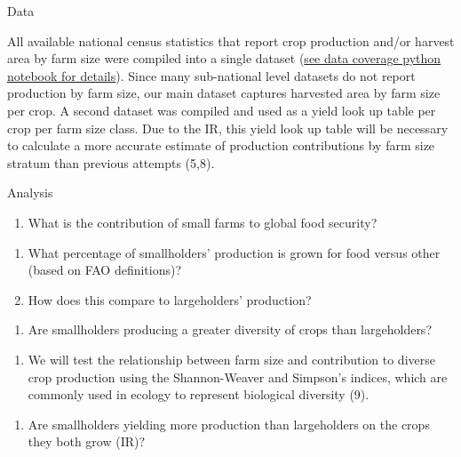 \documentclass[11pt]{article}
\providecommand{\tightlist}{%
      \setlength{\itemsep}{0pt}\setlength{\parskip}{0pt}}
\begin{document}
    Data

All available national census statistics that report crop production
and/or harvest area by farm size were compiled into a single dataset
(\href{https://vinnyricciardi6.wixsite.com/project-portfolio/farm-size-1}{see
data coverage python notebook for details}). Since many sub-national
level datasets do not report production by farm size, our main dataset
captures harvested area by farm size per crop. A second dataset was
compiled and used as a yield look up table per crop per farm size class.
Due to the IR, this yield look up table will be necessary to calculate a
more accurate estimate of production contributions by farm size stratum
than previous attempts (5,8).

    Analysis

\begin{enumerate}
\def\labelenumi{\arabic{enumi}.}
\tightlist
\item
  What is the contribution of small farms to global food security?
\end{enumerate}

\begin{enumerate}
\def\labelenumi{\alph{enumi}.}
\tightlist
\item
  What percentage of smallholders' production is grown for food versus
  other (based on FAO definitions)?
\item
  How does this compare to largeholders' production?
\end{enumerate}

\begin{enumerate}
\def\labelenumi{\arabic{enumi}.}
\setcounter{enumi}{1}
\tightlist
\item
  Are smallholders producing a greater diversity of crops than
  largeholders?
\end{enumerate}

\begin{enumerate}
\def\labelenumi{\alph{enumi}.}
\tightlist
\item
  We will test the relationship between farm size and contribution to
  diverse crop production using the Shannon-Weaver and Simpson's
  indices, which are commonly used in ecology to represent biological
  diversity (9).
\end{enumerate}

\begin{enumerate}
\def\labelenumi{\arabic{enumi}.}
\setcounter{enumi}{2}
\tightlist
\item
  Are smallholders yielding more production than largeholders on the
  crops they both grow (IR)?
\end{enumerate}
\end{document}
